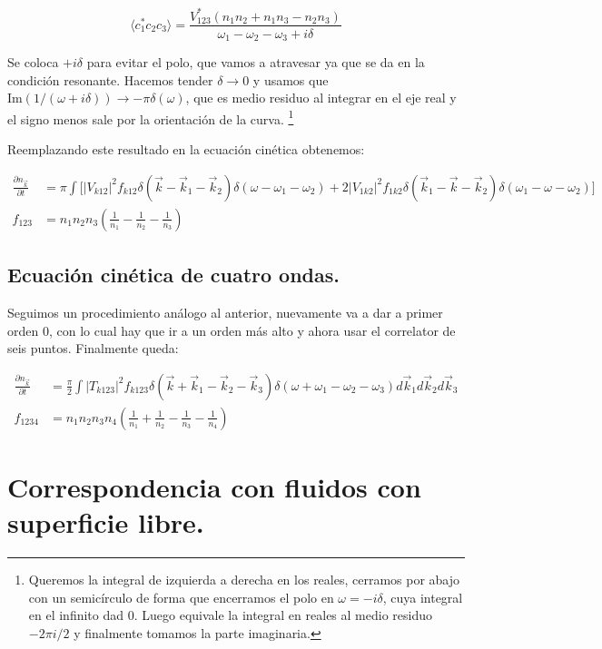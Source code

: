 \begin{equation}
	\langle c_1^*c_2c_3 \rangle = \frac{V_{123}^*(n_1n_2+n_1n_3-n_2n_3)}{\omega_1-\omega_2-\omega_3+i\delta}
\end{equation} 

Se coloca $+i\delta$ para evitar el polo, que vamos a atravesar ya que se da en la condición resonante. Hacemos tender $\delta\rightarrow0$ y usamos que $\text{Im}(1/(\omega+i\delta))\rightarrow-\pi\delta(\omega)$, que es medio residuo al integrar en el eje real y el signo menos sale por la orientación de la curva. \footnote{Queremos la integral de izquierda a derecha en los reales, cerramos por abajo con un semicírculo de forma que encerramos el polo en $\omega=-i\delta$, cuya integral en el infinito dad 0. Luego equivale la integral en reales al medio residuo $-2\pi i/2$ y finalmente tomamos la parte imaginaria.} 


Reemplazando este resultado en la ecuación cinética obtenemos:

\begin{align}
	\frac{\partial n_{\vec k}}{\partial t} &= \pi \int\big[|V_{k12}|^2f_{k12}\delta(\vec k - \vec k_1 - \vec k_2) \delta(\omega - \omega_1 - \omega_2) + 2 |V_{1k2}|^2 f_{1k2} \delta(\vec k_1 - \vec k - \vec k_2) \delta(\omega_1 - \omega - \omega_2) \big]  \\ 
	f_{123} &= n_1n_2n_3\left(\frac{1}{n_1} - \frac{1}{n_2} -  \frac{1}{n_3}\right)
\end{align}


\subsection*{Ecuación cinética de cuatro ondas.}
Seguimos un procedimiento análogo al anterior, nuevamente va a dar a primer orden 0, con lo cual hay que ir a un orden más alto y ahora usar el correlator de seis puntos. Finalmente queda:

\begin{align}
	\frac{\partial n_{\vec k}}{\partial t} &= \frac{\pi}{2} \int |T_{k123}|^2 f_{k123} \delta(\vec k + \vec k_1 - \vec k_2 -\vec k_3) \delta(\omega + \omega_1 -\omega_2 - \omega_3) d\vec k_1 d\vec k_2 d\vec k_3 \\
	f_{1234} &= n_1n_2n_3n_4\left(\frac{1}{n_1} + \frac{1}{n_2} - \frac{1}{n_3} - \frac{1}{n_4} \right)
\end{align}






\section{Correspondencia con fluidos con superficie libre.}



